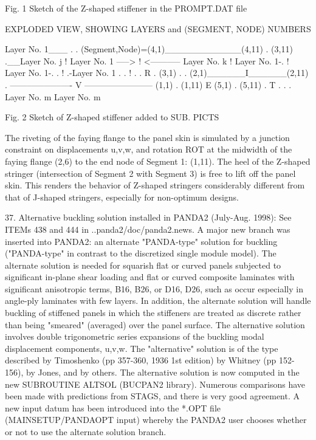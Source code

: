          Fig. 1 Sketch of the Z-shaped stiffener in the PROMPT.DAT file


    EXPLODED VIEW, SHOWING LAYERS and (SEGMENT, NODE) NUMBERS

                       Layer No. 1___
                                     . 
                                      . 
             (Segment,Node)=(4,1)____________(4,11)
                                         . 
                              (3,11)      .__Layer No. j
                                !  
             Layer No. 1 -----> ! <----------- Layer No. k
                                !   
             Layer No. 1-.      !   
 Layer No. 1-.            .     !         .-Layer No. 1
            .              .    !          .
           .             R  . (3,1)         .
          .   (2,1)______I______(2,11)       .
 ----------------------  V  ------------------------
 (1,1)    .       (1,11) E (5,1)              .   (5,11)
           .             T                     .
            .                                   .
             Layer No. m                         Layer No. m


        Fig. 2  Sketch of Z-shaped stiffener added to SUB. PICTS


The riveting of the faying flange to the panel skin is simulated by
a junction constraint on displacements u,v,w, and rotation ROT at the
midwidth of the faying flange (2,6) to the end node of Segment 1: (1,11).
The heel of the Z-shaped stringer (intersection of Segment 2 with Segment
3) is free to lift off the panel skin. This renders the behavior of
Z-shaped stringers considerably different from that of J-shaped stringers,
especially for non-optimum designs.


37. Alternative buckling solution installed in PANDA2 (July-Aug. 1998):
See ITEMs 438 and 444 in ..panda2/doc/panda2.news. A major new branch was
inserted into PANDA2: an alternate "PANDA-type" solution for buckling
("PANDA-type" in contrast to the discretized single module model). The
alternate solution is needed for squarish flat or curved panels subjected
to significant in-plane shear loading and flat or curved composite
laminates with significant anisotropic terms, B16, B26, or D16, D26, such
as occur especially in angle-ply laminates with few layers. In addition,
the alternate solution will handle buckling of stiffened panels in which
the stiffeners are treated as discrete rather than being "smeared"
(averaged) over the panel surface. The alternative solution involves
double trigonometric series expansions of the buckling modal displacement
components, u,v,w. The "alternative" solution is of the type described by
Timoshenko (pp 357-360, 1936 1st edition) by Whitney (pp 152-156), by
Jones, and by others. The alternative solution is now computed in the new
SUBROUTINE ALTSOL (BUCPAN2 library). Numerous comparisons have been made
with predictions from STAGS, and there is very good agreement. A new input
datum has been introduced into the *.OPT file (MAINSETUP/PANDAOPT input)
whereby the PANDA2 user chooses whether or not to use the alternate
solution branch. 

